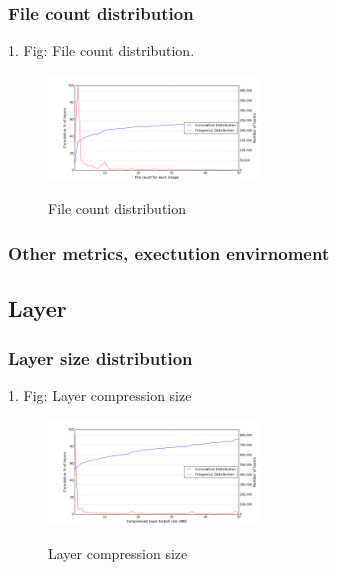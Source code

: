 \subsubsection{File count distribution}

1. Fig: File count distribution.

\begin{figure}
	\centering
	\includegraphics[width=0.5\textwidth]{graphs/distributionFile_count_for_each_image.png}\\
	\caption{File count distribution}\label{fig_image_size_compression}
\end{figure}

\subsubsection{Other metrics, exectution envirnoment}

\subsection{Layer}

\subsubsection{Layer size distribution}

1. Fig: Layer compression size

\begin{figure}
	\centering
	\includegraphics[width=0.5\textwidth]{graphs/distributionCompressed_layer_tarball_size_(MB).png}\\
	\caption{Layer compression size}\label{fig_image_size_compression}
\end{figure}

